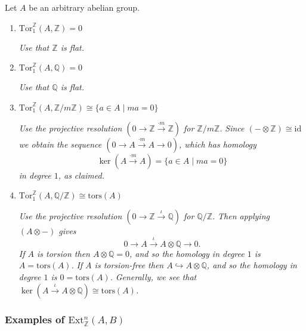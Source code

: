 \documentclass[10pt]{article}
\begin{document}
                Let $A$ be an arbitrary abelian group.

                \begin{enumerate}
                \def\labelenumi{\arabic{enumi}.}
                \item
                  $\mathrm{Tor}_1^\mathbb{Z}(A,\mathbb{Z})=0$

                  \emph{Use that $\mathbb{Z}$ is flat.}
                \item
                  $\mathrm{Tor}_1^\mathbb{Z}(A,\mathbb{Q})=0$

                  \emph{Use that $\mathbb{Q}$ is flat.}
                \item
                  $\mathrm{Tor}_1^\mathbb{Z}(A,\mathbb{Z}/m\mathbb{Z})\cong\{a\in A\mid ma=0\}$

                  \emph{Use the projective resolution
                  $(0\to\mathbb{Z}\xrightarrow{\cdot m}\mathbb{Z})$ for
                  $\mathbb{Z}/m\mathbb{Z}$.} \emph{Since
                  $(-\otimes\mathbb{Z})\cong\mathrm{id}$ we obtain the sequence
                  $(0\to A\xrightarrow{\cdot m}A\to0)$, which has homology}
                  \[\ker(A\xrightarrow{\cdot m}A)=\{a\in A\mid ma=0\}\] \emph{in degree
                  $1$, as claimed.}
                \item
                  $\mathrm{Tor}_1^\mathbb{Z}(A,\mathbb{Q}/\mathbb{Z})\cong\mathrm{tors}(A)$

                  \emph{Use the projective resolution
                  $(0\to\mathbb{Z}\xrightarrow{\iota}\mathbb{Q})$ for
                  $\mathbb{Q}/\mathbb{Z}$.} \emph{Then applying $(A\otimes-)$ gives}
                  \[0\to A\xrightarrow{\iota}A\otimes\mathbb{Q}\to0.\] \emph{If $A$ is
                  torsion then $A\otimes\mathbb{Q}=0$, and so the homology in degree
                  $1$ is $A=\mathrm{tors}(A)$.} \emph{If $A$ is torsion-free then
                  $A\hookrightarrow A\otimes\mathbb{Q}$, and so the homology in degree
                  $1$ is $0=\mathrm{tors}(A)$.} \emph{Generally, we see that
                  $\ker(A\xrightarrow{\iota}A\otimes\mathbb{Q})\cong\mathrm{tors}(A)$.}
                \end{enumerate}



            \subsubsection{Examples of $\mathrm{Ext}_\mathbb{Z}^n(A,B)$}
\end{document}
